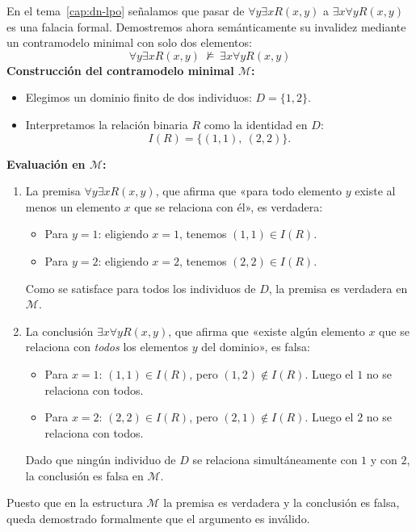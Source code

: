 \begin{ejemplo}
En el tema~\ref{cap:dn-lpo} señalamos que pasar de $\forall y \exists x R(x, y)$ a $\exists x \forall y R(x, y)$ es una falacia formal. Demostremos ahora semánticamente su invalidez mediante un contramodelo minimal con solo dos elementos:
\[
\forall y \exists x R(x, y) \ \not\models \ \exists x \forall y R(x, y)
\]
\textbf{Construcción del contramodelo minimal $\mathcal{M}$:}
\begin{itemize}
    \item Elegimos un dominio finito de dos individuos: $D = \{1, 2\}$.
    \item Interpretamos la relación binaria $R$ como la identidad en $D$:
    \[
    I(R) = \{(1, 1), \ (2, 2)\}.
    \]
\end{itemize}
\textbf{Evaluación en $\mathcal{M}$:}
\begin{enumerate}
    \item La premisa $\forall y \exists x R(x, y)$, que afirma que «para todo elemento $y$ existe al menos un elemento $x$ que se relaciona con él», es verdadera:
    \begin{itemize}
        \item Para $y = 1$: eligiendo $x = 1$, tenemos $(1, 1) \in I(R)$.
        \item Para $y = 2$: eligiendo $x = 2$, tenemos $(2, 2) \in I(R)$.
    \end{itemize}
    Como se satisface para todos los individuos de $D$, la premisa es verdadera en $\mathcal{M}$.
    \item La conclusión $\exists x \forall y R(x, y)$, que afirma que «existe algún elemento $x$ que se relaciona con \emph{todos} los elementos $y$ del dominio», es falsa:
    \begin{itemize}
        \item Para $x = 1$: $(1, 1) \in I(R)$, pero $(1, 2) \notin I(R)$. Luego el $1$ no se relaciona con todos.
        \item Para $x = 2$: $(2, 2) \in I(R)$, pero $(2, 1) \notin I(R)$. Luego el $2$ no se relaciona con todos.
    \end{itemize}
    Dado que ningún individuo de $D$ se relaciona simultáneamente con $1$ y con $2$, la conclusión es falsa en $\mathcal{M}$.
\end{enumerate}
Puesto que en la estructura $\mathcal{M}$ la premisa es verdadera y la conclusión es falsa, queda demostrado formalmente que el argumento es inválido.
\end{ejemplo}

